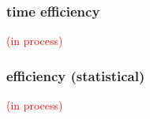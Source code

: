 \subsubsection{time efficiency}
%
\textcolor{red}{(in process)}

\begin{comment}
	time needed for each judgement based on method from (Coertjens_et_al_2017).
	
	statistical efficiency has been researched on \citet{Leijon_et_al_2019} and \citet{Pritikin_2020} for the bayesian dichotomous BTL model and the ordinal BTL model, respectively.
\end{comment}
%
%
\subsubsection{efficiency (statistical)}
%
\textcolor{red}{(in process)}